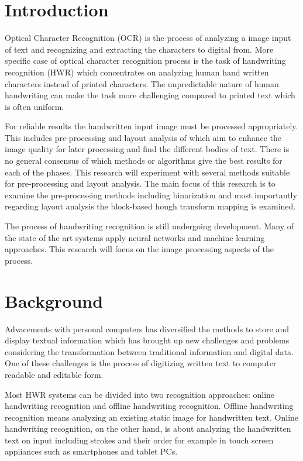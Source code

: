 \documentclass{article}
\begin{document}
   \newpage
   \section{Introduction}
    Optical Character Recognition (OCR) is the process of analyzing a image input of  text and recognizing and extracting the characters to digital from. More specific case of optical character recognition process is the task of handwriting recognition (HWR) which concentrates on analyzing human hand written characters instead of printed characters. The unpredictable nature of human handwriting can make the task more challenging compared to printed text which is often uniform.

    For reliable results the handwritten input image must be processed appropriately. This includes pre-processing and layout analysis of which aim to enhance the image quality for later processing and find the different bodies of text. There is no general consensus of which methods or algorithms give the best results for each of the phases. This research will experiment with several methods suitable for pre-processing and layout analysis. The main focus of this research is to examine the pre-processing methods including binarization and most importantly regarding layout analysis the block-based hough transform mapping is examined.

    The process of handwriting recognition is still undergoing development. Many of the state of the art systems apply neural networks and machine learning approaches. This research will focus on the image processing aspects of the process.

  \newpage
  \section{Background}
    Advacements with personal computers has diversified the methods to store and display textual information which has brought up new challenges and problems considering the transformation between traditional information and digital data. One of these challenges is the process of digitizing written text to computer readable and editable form.

     Most HWR systems can be divided into two recognition approaches: online handwriting recognition and offline handwriting recognition. Offline handwriting recognition means analyzing an existing static image for handwritten text. Online handwriting recognition, on the other hand, is about analyzing the handwritten text on input including strokes and their order for example in touch screen appliances such as smartphones and tablet PCs.
\end{document}
